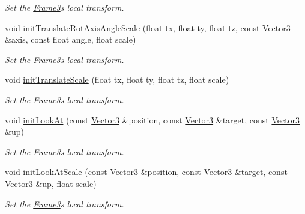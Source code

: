 \begin{DoxyCompactItemize}
\begin{DoxyCompactList}\small\item\em Set the \hyperlink{class_i_dream_sky_1_1_frame3}{Frame3}\textquotesingle{}s local transform. \end{DoxyCompactList}\item 
void \hyperlink{class_i_dream_sky_1_1_frame3_a7ba0768f41a6ade313be98aae276d271}{init\+Translate\+Rot\+Axis\+Angle\+Scale} (float tx, float ty, float tz, const \hyperlink{class_i_dream_sky_1_1_vector3}{Vector3} \&axis, const float angle, float scale)
\begin{DoxyCompactList}\small\item\em Set the \hyperlink{class_i_dream_sky_1_1_frame3}{Frame3}\textquotesingle{}s local transform. \end{DoxyCompactList}\item 
void \hyperlink{class_i_dream_sky_1_1_frame3_a86f0c879ee98d644332b67cf91d066ed}{init\+Translate\+Scale} (float tx, float ty, float tz, float scale)
\begin{DoxyCompactList}\small\item\em Set the \hyperlink{class_i_dream_sky_1_1_frame3}{Frame3}\textquotesingle{}s local transform. \end{DoxyCompactList}\item 
void \hyperlink{class_i_dream_sky_1_1_frame3_ab053a9525153c0d772d95fd309ae99b6}{init\+Look\+At} (const \hyperlink{class_i_dream_sky_1_1_vector3}{Vector3} \&position, const \hyperlink{class_i_dream_sky_1_1_vector3}{Vector3} \&target, const \hyperlink{class_i_dream_sky_1_1_vector3}{Vector3} \&up)
\begin{DoxyCompactList}\small\item\em Set the \hyperlink{class_i_dream_sky_1_1_frame3}{Frame3}\textquotesingle{}s local transform. \end{DoxyCompactList}\item 
void \hyperlink{class_i_dream_sky_1_1_frame3_a78d62bc06554dc2fa8b0405bdcbb03c9}{init\+Look\+At\+Scale} (const \hyperlink{class_i_dream_sky_1_1_vector3}{Vector3} \&position, const \hyperlink{class_i_dream_sky_1_1_vector3}{Vector3} \&target, const \hyperlink{class_i_dream_sky_1_1_vector3}{Vector3} \&up, float scale)
\begin{DoxyCompactList}\small\item\em Set the \hyperlink{class_i_dream_sky_1_1_frame3}{Frame3}\textquotesingle{}s local transform. \end{DoxyCompactList}\item 

\end{DoxyCompactItemize}
